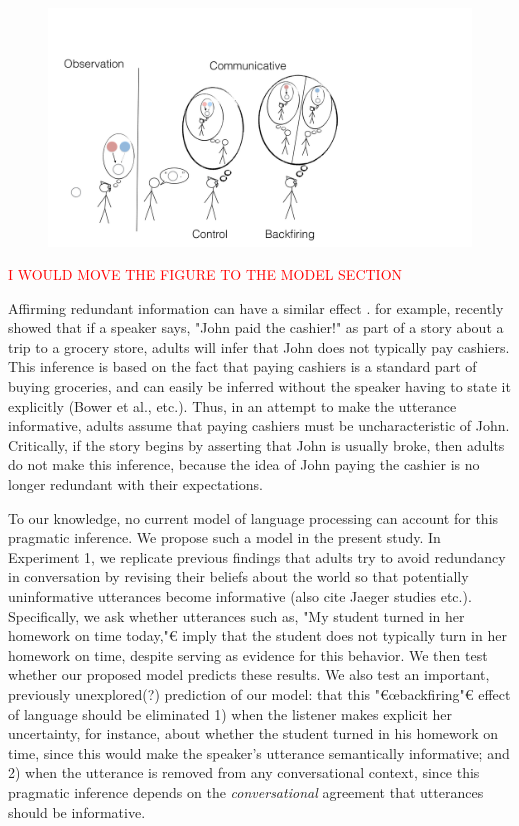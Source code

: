 \documentclass[10pt,letterpaper]{article}
\newcommand{\red}[1]{\textcolor{Red}{#1}}
\begin{document}
\begin{figure}
\centering
    \includegraphics[width=\columnwidth]{cartoon}
    \caption{}
  \label{fig:cartoon}
\end{figure}

\red{I WOULD MOVE THE FIGURE TO THE MODEL SECTION}

Affirming redundant information can have a similar effect \cite{Gruenfeld1992, Kravtchenko2015}.  
 for example, recently showed that if a speaker says, "John paid the cashier!" as part of a story about a trip to a grocery store, adults will infer that John does not typically pay cashiers.  This inference is based on the fact that paying cashiers is a standard part of buying groceries, and can easily be inferred without the speaker having to state it explicitly (Bower et al., etc.).  Thus, in an attempt to make the utterance informative, adults assume that paying cashiers must be uncharacteristic of John.  Critically, if the story begins by asserting that John is usually broke, then adults do not make this inference, because the idea of John paying the cashier is no longer redundant with their expectations.

To our knowledge, no current model of language processing can account for this pragmatic inference.  We propose such a model in the present study.  In Experiment 1, we replicate previous findings that adults try to avoid redundancy in conversation by revising their beliefs about the world so that potentially uninformative utterances become informative \cite{Kravtchenko2015} (also cite Jaeger studies etc.).  Specifically, we ask whether utterances such as, "My student turned in her homework on time today,"€ imply that the student does not typically turn in her homework on time, despite serving as evidence for this behavior.  We then test whether our proposed model predicts these results.  We also test an important, previously unexplored(?) prediction of our model: that this "€œbackfiring"€ effect of language should be eliminated 1) when the listener makes explicit her uncertainty, for instance, about whether the student turned in his homework on time, since this would make the speaker's utterance semantically informative; and 2) when the utterance is removed from any conversational context, since this pragmatic inference depends on the \emph{conversational} agreement that utterances should be informative.
\end{document}
